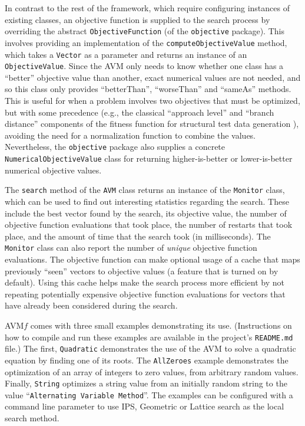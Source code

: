 \documentclass{llncs}
\newcommand{\AVM}{Alternating Variable Method\xspace}
\newcommand{\name}{AVM\hspace{-1pt}$f$\xspace}
\newcommand{\inlineheading}[1]{\vspace{1ex} \noindent {\bf #1.}}
\begin{document}
\begin{sloppypar}
\inlineheading{Objective Function} In contrast to the rest of the framework, which require configuring instances of existing classes, an objective function is supplied to the search process by overriding the abstract {\tt ObjectiveFunction} (of the {\tt objective} package). This involves providing an implementation of the {\tt computeObjectiveValue} method, which takes a {\tt Vector} as a parameter and returns an instance of an {\tt ObjectiveValue}. Since the AVM only needs to know whether one class has a ``better'' objective value than another, exact numerical values are not needed, and so this class only provides ``betterThan'', ``worseThan'' and ``sameAs'' methods. This is useful for when a problem involves two objectives that must be optimized, but with some precedence (e.g., the classical ``approach level'' and ``branch distance'' components of the fitness function for structural test data generation \cite{}), avoiding the need for a normalization function to combine the values. %
Nevertheless, the {\tt objective} package also supplies a concrete {\tt NumericalObjectiveValue} class for returning higher-is-better or lower-is-better numerical objective values.
\end{sloppypar}

\begin{sloppypar}
\inlineheading{Reporting} The {\tt search} method of the {\tt AVM} class returns an instance of the {\tt Monitor} class, which can be used to find out interesting statistics regarding the search. These include the best vector found by the search, its objective value, the number of objective function evaluations that took place, the number of restarts that took place, and the amount of time that the search took (in milliseconds). The {\tt Monitor} class can also report the number of {\it unique} objective function evaluations. The objective function can make optional usage of a cache that maps previously ``seen'' vectors to objective values (a feature that is turned on by default). Using this cache helps make the search process more efficient by not repeating potentially expensive objective function evaluations for vectors that have already been considered during the search.
\end{sloppypar}

\inlineheading{Examples} \name comes with three small examples demonstrating its use. (Instructions on how to compile and run these examples are available in the project's {\tt README.md} file.) The first, {\tt Quadratic} demonstrates the use of the AVM to solve a quadratic equation by finding one of its roots. The {\tt AllZeroes} example demonstrates the optimization of an array of integers to zero values, from arbitrary random values. Finally, {\tt String} optimizes a string value from an initially random string to the value ``{\tt \AVM}''. The examples can be configured with a command line parameter to use IPS, Geometric or Lattice search as the local search method.
\end{document}
